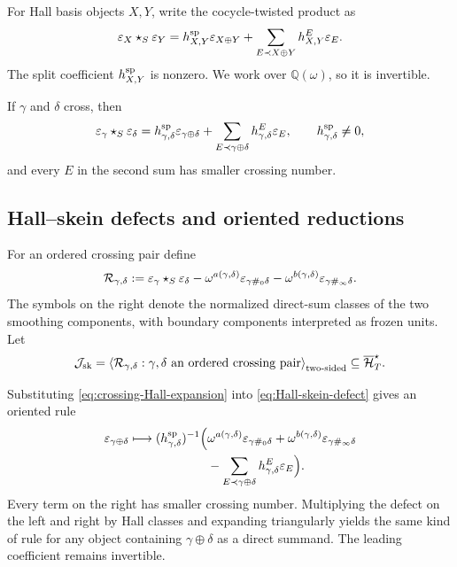 For Hall basis objects $X,Y$, write the cocycle-twisted product as
\begin{equation}
 \varepsilon_X\star_S\varepsilon_Y
 =h^{\rm sp}_{X,Y}\varepsilon_{X\oplus Y}
  +\sum_{E\prec X\oplus Y}h^E_{X,Y}\varepsilon_E.
 \label{eq:Hall-triangular-product}
\end{equation}
The split coefficient $h^{\rm sp}_{X,Y}$ is nonzero.  We work over
$\mathbb Q(\omega)$, so it is invertible.

\begin{corollary}
\label{cor:crossing-leading}
If $\gamma$ and $\delta$ cross, then
\begin{equation}
 \varepsilon_\gamma\star_S\varepsilon_\delta
 =h^{\rm sp}_{\gamma,\delta}\varepsilon_{\gamma\oplus\delta}
  +\sum_{E\prec\gamma\oplus\delta}
      h^E_{\gamma,\delta}\varepsilon_E,
 \qquad h^{\rm sp}_{\gamma,\delta}\ne0,
 \label{eq:crossing-Hall-expansion}
\end{equation}
and every $E$ in the second sum has smaller crossing number.
\end{corollary}

\subsection{Hall--skein defects and oriented reductions}

For an ordered crossing pair define
\begin{equation}
 \mathcal R_{\gamma,\delta}
 :=\varepsilon_\gamma\star_S\varepsilon_\delta
   -\omega^{a(\gamma,\delta)}
      \varepsilon_{\gamma\#_0\delta}
   -\omega^{b(\gamma,\delta)}
      \varepsilon_{\gamma\#_\infty\delta}.
 \label{eq:Hall-skein-defect}
\end{equation}
The symbols on the right denote the normalized direct-sum classes of the two
smoothing components, with boundary components interpreted as frozen units.
Let
\begin{equation}
 \mathcal J_{\mathrm{sk}}=
 \left\langle
   \mathcal R_{\gamma,\delta}:
   \gamma,\delta\text{ an ordered crossing pair}
 \right\rangle_{\rm two\text{-}sided}
 \subseteq\overline{\mathcal H}_{T}^{\star}.
 \label{eq:skein-ideal}
\end{equation}

Substituting \eqref{eq:crossing-Hall-expansion} into
\eqref{eq:Hall-skein-defect} gives an oriented rule
\begin{equation}
\begin{aligned}
 \varepsilon_{\gamma\oplus\delta}
 \longmapsto
 (h^{\rm sp}_{\gamma,\delta})^{-1}
 \Big(&\omega^{a(\gamma,\delta)}
       \varepsilon_{\gamma\#_0\delta}
      +\omega^{b(\gamma,\delta)}
       \varepsilon_{\gamma\#_\infty\delta}\\
     &-\sum_{E\prec\gamma\oplus\delta}
       h^E_{\gamma,\delta}\varepsilon_E\Big).
\end{aligned}
\label{eq:basic-Hall-straightening}
\end{equation}
Every term on the right has smaller crossing number.  Multiplying the defect
on the left and right by Hall classes and expanding triangularly yields the
same kind of rule for any object containing $\gamma\oplus\delta$ as a direct
summand.  The leading coefficient remains invertible.

